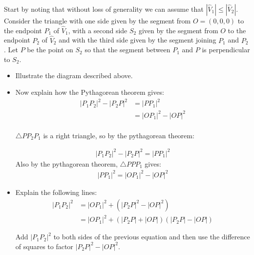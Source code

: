 \documentclass{ximera}
\begin{document}
\begin{problem}
Start by noting that without loss of generality we can assume that
$\left\vert \hat{V} _{1}\right\vert \le\left\vert
\hat{V}_{2}\right\vert$. Consider the triangle with one side given by
the segment from $O=\left( 0,0,0\right) $ to the endpoint $P_{1}$ of
$\hat{V}_{1}$, with a second side $S_{2}$ given by the segment from
$O$ to the endpoint $P_{2}$ of $\hat{V}_{2}$ and with the third side
given by the segment joining $P_{1}$ and $P_{2}$. Let $P$ be the
point on $S_{2}$ so that the segment between $P_{1}$ and $P$ is
perpendicular to $S_{2}$.
\begin{itemize}
\item Illustrate the diagram described above. 
\item Now explain how the Pythagorean theorem gives:
\begin{align*}
|P_{1}P_{2}|^{2} -  |P_{2}P|^{2} &= |PP_{1}|^{2}\\
&= |OP_{1}|^{2} - |OP|^{2}\\
\end{align*}

\begin{freeResponse}
$\triangle PP_{2}P_{1}$ is a right triangle, so by the pythagorean theorem:

\begin{align*}
|P_{1}P_{2}|^{2} - |P_{2}P|^{2} = |PP_{1}|^{2}
\end{align*}
Also by the pythagorean theorem, $ \triangle PPP_{1}$ gives:
\begin{align*}  |PP_{1}|^{2} = |OP_{1}|^{2} - |OP|^{2}
\end{align*}

\end{freeResponse}

\item Explain the following lines:
\begin{align*}
|P_{1}P_{2}|^{2} &= |OP_{1}|^{2}+\left(|P_{2}P|^{2}-|OP|^{2}\right) \\
&=|OP_{1}|^{2}+\left(|P_{2}P|+|OP|\right)\left(|P_{2}P|-|OP| \right)
\end{align*}

\begin{freeResponse}
Add $|P_{1}P_{2}|^2$ to both sides of the previous equation and then use the difference of squares to factor $|P_{2}P|^{2}- |OP|^2$.
\end{freeResponse}


\end{itemize}
\end{problem}
\end{document}
